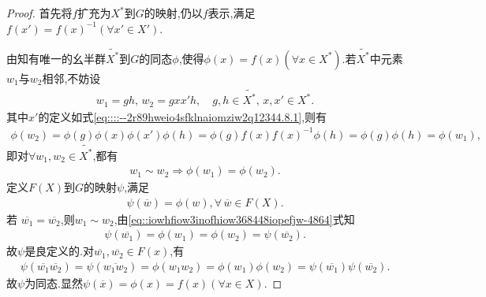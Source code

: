 \documentclass[../../main.tex]{subfiles}%
\begin{document}
\begin{proof}
首先将$f$扩充为$X^*$到$G$的映射,仍以$f$表示,满足$f(x')=f(x)^{-1}(\forall x'\in X')$.

由知有唯一的幺半群$\widetilde{X^*}$到$G$的同态$\phi$,使得$\phi(x)=f(x)(\forall x\in X^*)$.若$\widetilde{X^*}$中元素$w_1$与$w_2$相邻,不妨设
\begin{align*}
w_1=gh,\,w_2=gxx'h,\quad g,h\in \widetilde{X^*},\,x,x'\in X^*.
\end{align*}
其中$x'$的定义如式\eqref{eq::::--2r89hweio4sfklnaiomziw2q12344.8.1},则有
\begin{align*}
\phi (w_2)=\phi (g)\phi (x)\phi (x' )\phi (h)=\phi (g)f(x)f(x)^{-1}\phi (h)=\phi (g)\phi (h)=\phi (w_1),
\end{align*}
即对$\forall w_1,w_2\in \widetilde{X^*}$,都有
\begin{align}\label{eq::iowhfiow3inofhiow368448iopefjw-4864}
w_1\sim w_2\Longrightarrow  \phi(w_1)=\phi(w_2).
\end{align}
定义$F(X)$到$G$的映射$\psi$,满足
\begin{align*}
\psi(\overline{w})=\phi(w),\forall \,\overline{w}\in F(X).
\end{align*}
若
$\overline{w_1}=\overline{w_2}$,则$w_1\sim w_2$,由\eqref{eq::iowhfiow3inofhiow368448iopefjw-4864}式知
\begin{align*}
\psi \left( \overline{w_1} \right) =\phi \left( w_1 \right) =\phi \left( w_2 \right) =\psi \left( \overline{w_2} \right) .
\end{align*}
故$\psi$是良定义的.对$\overline{w_1},\overline{w_2}\in F(x)$,有
\begin{align*}
\psi \left( \overline{w_1}\overline{w_2} \right) =\psi \left( \overline{w_1w_2} \right) =\phi \left( w_1w_2 \right) =\phi \left( w_1 \right) \phi \left( w_2 \right) =\psi \left( \overline{w_1} \right) \psi \left( \overline{w_2} \right) .
\end{align*}
故$\psi$为同态.显然$\psi(\overline{x})=\phi(x)=f(x)(\forall x\in X)$. 


\end{proof}
\end{document}
